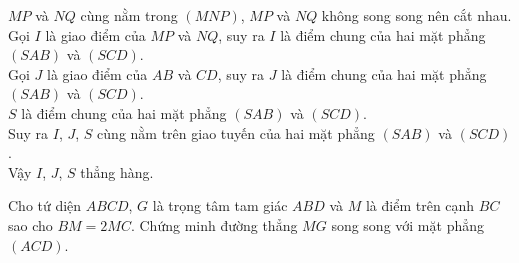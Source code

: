 \begin{bt}
{\begin{listEX}
		\item[c)]
	$MP$ và $NQ$ cùng nằm trong $\left(MNP\right)$, $MP$ và $NQ$ không song song nên cắt nhau.\\
	Gọi $I$ là giao điểm của $MP$ và $NQ$, suy ra $I$ là điểm chung của hai mặt phẳng $\left(SAB\right)$ và $\left(SCD\right)$.\\
	Gọi $J$ là giao điểm của $AB$ và $CD$, suy ra $J$ là điểm chung của hai mặt phẳng $\left(SAB\right)$ và $\left(SCD\right)$.\\
	$S$ là điểm chung của hai mặt phẳng $\left(SAB\right)$ và $\left(SCD\right)$.\\
	Suy ra $I$, $J$, $S$ cùng nằm trên giao tuyến của hai mặt phẳng $\left(SAB\right)$ và $\left(SCD\right)$.\\
	Vậy $I$, $J$, $S$ thẳng hàng.
\end{listEX}

}
\end{bt}

\begin{bt}%

	Cho tứ diện $ABCD$, $G$ là trọng tâm tam giác $ABD$ và $M$ là điểm trên cạnh $BC$ sao cho $BM=2MC$. Chứng minh đường thẳng $MG$ song song với mặt phẳng $(ACD)$.
\end{bt}

